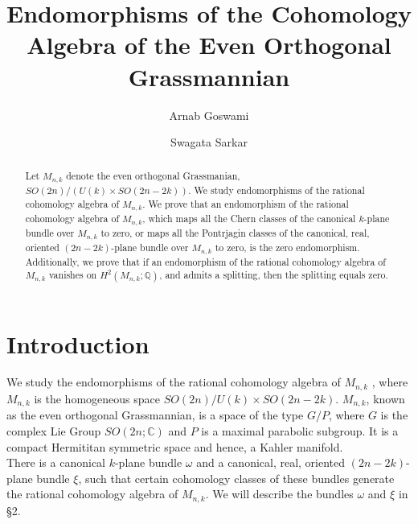 \documentclass[a4paper,leqno,12pt]{amsart}
\title{}
\author{}
\date{}
\theoremstyle{plain}
\theoremstyle{definition}
\theoremstyle{remark}
\newcommand{\Q}{\mathbb{Q}}
\newcommand{\C}{\mathbb{C}}
\begin{document}
\title{Endomorphisms of the Cohomology Algebra of the Even Orthogonal Grassmannian}
\author{Arnab Goswami}
\address{School of Mathematical Sciences, 
 UM-DAE Centre for Excellence in Basic Sciences, 
University of Mumbai,  Kalina,  Santacruz (East), 
Mumbai - 400098,  India.}


\author{Swagata Sarkar}
\address{School of Mathematical Sciences, 
 UM-DAE Centre for Excellence in Basic Sciences, 
University of Mumbai,  Kalina,  Santacruz (East), 
Mumbai - 400098,  India.}

 



\maketitle


\begin{abstract}
Let $M_{n,k}$ denote the even orthogonal Grassmanian,  $SO(2n) / (U(k) \times SO(2n-2k) )$.  We study  endomorphisms of the rational cohomology algebra of $M_{n,k}$.  We prove that an endomorphism of the rational cohomology algebra of $M_{n,k}$,  which maps all the Chern classes of the canonical $k$-plane bundle over $M_{n,k}$ to zero,  or maps all the Pontrjagin classes of the canonical,  real,  oriented $(2n-2k)$-plane bundle over $M_{n,k}$ to zero,   is the zero endomorphism.   Additionally,  we prove that if an endomorphism of the rational cohomology algebra of $M_{n,k}$ vanishes on $H^{2}(M_{n,k}; \Q)$,   and admits a splitting,  then the splitting equals zero.  

\end{abstract}




\section{Introduction}

\noindent
We study the endomorphisms of the rational cohomology algebra of $M_{n,k}$ ,  where $M_{n,k}$ is the homogeneous space $SO(2n) / U(k) \times SO(2n-2k) $.  $M_{n,k}$, known as the even orthogonal Grassmannian,  is a space of the type $G/P$,  where $G$ is the complex Lie Group $SO(2n; \C)$ and $P$ is a maximal parabolic subgroup.  It is a compact Hermititan symmetric space and hence,  a Kahler manifold.   \\
\noindent
There is a canonical $k$-plane bundle $\omega$ and a canonical,  real, oriented $(2n-2k)$-plane bundle $\xi$,  such that certain cohomology classes of these bundles generate the rational cohomology algebra of $M_{n,k}$.  We will describe the bundles $\omega$ and $\xi$ in \S 2.  \\
 
\end{document}
